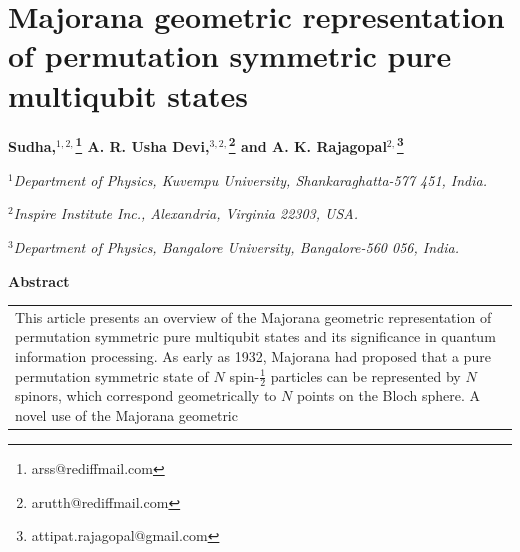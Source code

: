 \chapter[Majorana geometric representation of permutation...]{Majorana geometric representation of permutation symmetric pure multiqubit states} 

\renewcommand{\thefootnote}{\fnsymbol{footnote}}
\begin{center}
\textbf{Sudha,$^{1,2,}$\footnote{arss@rediffmail.com} A. R. Usha Devi,$^{3,2,}$\footnote{arutth@rediffmail.com} and A. K. Rajagopal$^{2,}$\footnote{attipat.rajagopal@gmail.com}}

\textit{$^{1}$Department of Physics, Kuvempu University, Shankaraghatta-577 451, India.}

\textit{$^{2}$Inspire Institute Inc., Alexandria, Virginia 22303, USA.}

\textit{$^{3}$Department of Physics, Bangalore University, Bangalore-560 056, India.} 
\end{center}

\vspace{-.4cm}

\begin{center}
\textbf{Abstract}
\end{center}

\vspace{-.5cm}

\begin{longtable}{p{8cm}}
{\parfillskip=0pt This article presents an overview of the Majorana geometric representation of permutation symmetric  pure multiqubit states and its significance in quantum information processing. As early as 1932, Majorana had proposed that a pure permutation symmetric state of $N$ spin-$\frac{1}{2}$ particles can be represented by $N$ spinors, which correspond geometrically to $N$ points on the Bloch sphere. A novel use of the Majorana geometric\par}\\
\end{longtable}

\newpage

